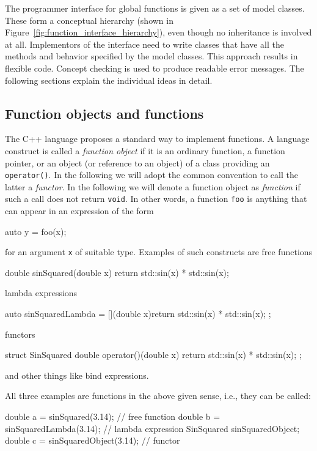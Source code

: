 \documentclass[11pt,
                 numbers=noenddot,
                 headings=normal,
                 DIV16, BCOR10mm]{scrartcl}
\newcommand{\cpp}{\lstinline}
\theoremstyle{remark}
\begin{document}
The programmer interface for global functions is given as a set of model classes.  These form a conceptual
hierarchy (shown in Figure~\ref{fig:function_interface_hierarchy}), even though no inheritance
is involved at all.  Implementors of the interface need to write classes that have all the methods
and behavior specified by the model classes. This approach results in flexible code.
Concept checking is used to produce readable error messages.
The following sections explain the individual ideas in detail.

\subsection{Function objects and functions}
\label{sec:function_objects_and_functions}

The C++ language proposes a standard way to implement functions.  A language construct is called a
{\em function object} if it is an ordinary function, a function pointer, or an object
(or reference to an object) of a class providing an \cpp{operator()}.
In the following we will adopt the common convention to call
the latter a \emph{functor}.
In the following we will denote a function object as \emph{function}
if such a call does not return \cpp{void}.
In other words, a function \cpp{foo} is anything that
can appear in an expression of the form
\begin{c++}
auto y = foo(x);
\end{c++}
for an argument \cpp{x} of suitable type. Examples of such constructs are free functions

\begin{minipage}{1.0\linewidth}
\begin{c++}
double sinSquared(double x)
{
  return std::sin(x) * std::sin(x);
}
\end{c++}
\end{minipage}
lambda expressions
\begin{c++}
auto sinSquaredLambda = [](double x){return std::sin(x) * std::sin(x); };
\end{c++}
functors
\begin{c++}
struct SinSquared
{
  double operator()(double x)
  {
    return std::sin(x) * std::sin(x);
  }
};
\end{c++}
and other things like bind expressions.

  All three examples are functions in the above given sense, i.e., they can be called:
  \begin{c++}
    double a = sinSquared(3.14);       // free function
    double b = sinSquaredLambda(3.14); // lambda expression
    SinSquared sinSquaredObject;
    double c = sinSquaredObject(3.14); // functor
  \end{c++}
\end{document}
